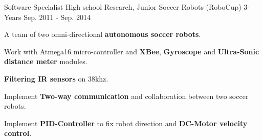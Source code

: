 \begin{cventries}
  \cventry
    {Software Specialist} %
    {High school Research, Junior Soccer Robots (RoboCup)} %
    {3-Years} %
    {Sep. 2011 - Sep. 2014} %
    {
      \begin{cvitems} %
        \item {A team of two omni-directional \textbf{autonomous soccer robots}.}
        \item {Work with Atmega16 micro-controller and \textbf{XBee}, \textbf{Gyroscope} and \textbf{Ultra-Sonic distance meter} modules.}
        \item {\textbf{Filtering IR sensors} on 38khz.}
        \item {Implement \textbf{Two-way communication} and collaboration between two soccer robots.}
        \item {Implement \textbf{PID-Controller} to fix robot direction and \textbf{DC-Motor velocity control}.}
      \end{cvitems}
    }


\end{cventries}
